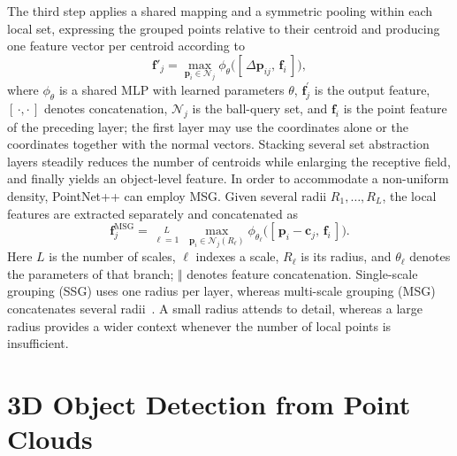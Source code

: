 The third step applies a shared mapping and
a symmetric pooling within each local set, expressing the grouped points
relative to their centroid and producing one feature vector per centroid according to
%
\begin{equation}
    \label{eq:sa_layer}
    \mathbf{f}'_j
    = \max_{\mathbf{p}_i \in \mathcal{N}_j}
      \phi_\theta\big( [\, \Delta \mathbf{p}_{ij},\, \mathbf{f}_i \,] \big),
\end{equation}
%
where $\phi_\theta$ is a shared MLP with learned parameters $\theta$,
$\mathbf f^{\prime}_j$ is the output feature, $[\,\cdot,\cdot\,]$ denotes concatenation, $\mathcal N_j$ is the ball-query set, and $\mathbf{f}_i$ is the point feature of the preceding layer; the first
layer may use the coordinates alone or the coordinates together with the
normal vectors. Stacking several set abstraction layers steadily reduces the
number of centroids while enlarging the receptive field, and finally yields
an object-level feature. In order to accommodate a non-uniform density,
PointNet++ can employ \ac{MSG}. Given several radii $R_1,\dots,R_L$, the
local features are extracted separately and concatenated as
%
\begin{equation}
    \label{eq:msg}
    \mathbf{f}^{\mathrm{MSG}}_j
    = \mathop{\Big\Vert}\limits_{\ell=1}^{L}\;
      \max_{\mathbf{p}_i \in \mathcal{N}_j(R_\ell)}
      \phi_{\theta_\ell}\big( [\, \mathbf{p}_i - \mathbf{c}_j,\, \mathbf{f}_i \,] \big).
\end{equation}
%
Here $L$ is the number of scales, $\ell$ indexes a scale, $R_\ell$ is its radius, and $\theta_\ell$ denotes the parameters of that branch; $\Vert$ denotes feature concatenation. Single-scale grouping (SSG) uses one radius per layer, whereas multi-scale grouping (MSG) concatenates several radii~\cite{qi2017pointnetpp}. A small radius attends to
detail, whereas a large radius provides a wider context whenever the number
of local points is insufficient.

\FloatBarrier
\section{3D Object Detection from Point Clouds}
\label{sec:detection}

